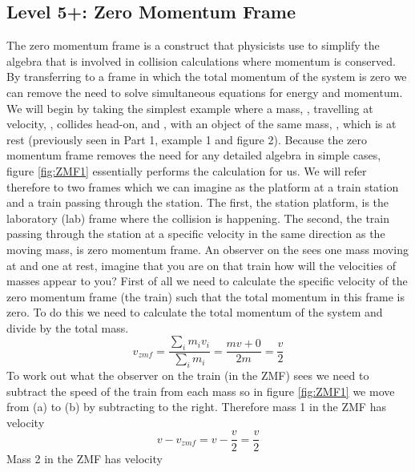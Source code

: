 \subsection{Level 5+: Zero Momentum Frame}
The zero momentum frame is a construct that physicists use to simplify the algebra that is involved in collision calculations where momentum is conserved.  By transferring to a frame in which the total momentum of the system is zero we can remove the need to solve simultaneous equations for energy and momentum.
{\noindent We will begin by taking the simplest example where a mass, , travelling at velocity, , collides head-on, and , with an object of the same mass, , which is at rest (previously seen in  Part 1, example 1 and figure 2).\nll
Because the zero momentum frame removes the need for any detailed algebra in simple cases, figure \ref{fig:ZMF1} essentially performs the calculation for us.  We will refer therefore to two frames which we can imagine as the platform at a train station and a train passing through the station.
The first, the station platform, is the laboratory (lab) frame where the collision is happening.  The second, the train passing through the station at a specific velocity in the same direction as the moving mass, is zero momentum frame.  An observer on the  sees one mass moving at  and one at rest,  imagine that you are on that train how will the velocities of masses appear to you? \nll
First of all we need to calculate the specific velocity of the zero momentum frame (the train) such that the total momentum in this frame is zero.  To do this we need to calculate the total momentum of the system and divide by the total mass.
\begin{equation}
v_{zmf}=\frac{\sum_i{m_i v_i}}{\sum_i m_i} = \frac{mv+0}{2m} = \frac{v}{2}
\end{equation}
\noindent To work out what the observer on the train (in the ZMF) sees we need to subtract the speed of the train from each mass so in figure \ref{fig:ZMF1} we move from (a) to (b) by subtracting  to the right.  Therefore mass 1 in the ZMF has velocity
\begin{equation}
v-v_{zmf}=v-\frac{v}{2}=\frac{v}{2}
\end{equation}
Mass 2 in the ZMF has velocity
\begin{equation}

\end{equation}}
